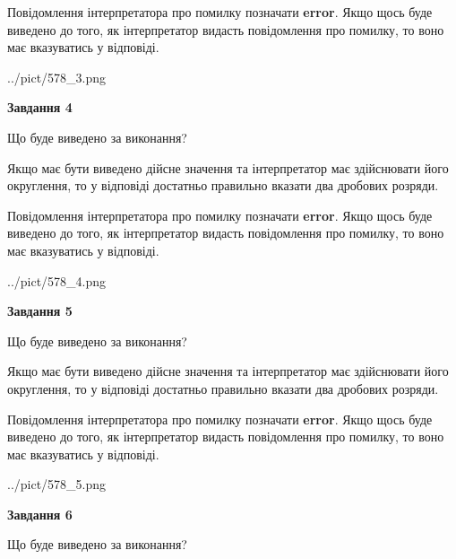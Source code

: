 \documentclass[12pt, ukrainian]{article}
\begin{document}
{\begin {Large}
Повідомлення інтерпретатора про помилку позначати \textbf{error}.
Якщо щось буде виведено до того, як інтерпретатор видасть повідомлення про помилку, 
то воно має вказуватись у відповіді. \par

\begin{center}
	{../pict/578_3.png}
\end{center}
\newpage

{\begin {center}\textbf{Завдання 4}\end {center}}\par
Що буде виведено за виконання? \par

Якщо має бути виведено дійсне значення та інтерпретатор має здійснювати його округлення, 
то у відповіді достатньо правильно вказати два дробових розряди.

Повідомлення інтерпретатора про помилку позначати \textbf{error}.
Якщо щось буде виведено до того, як інтерпретатор видасть повідомлення про помилку, 
то воно має вказуватись у відповіді. \par

\begin{center}
	{../pict/578_4.png}
\end{center}
\newpage

{\begin {center}\textbf{Завдання 5}\end {center}}\par
Що буде виведено за виконання? \par

Якщо має бути виведено дійсне значення та інтерпретатор має здійснювати його округлення, 
то у відповіді достатньо правильно вказати два дробових розряди.

Повідомлення інтерпретатора про помилку позначати \textbf{error}.
Якщо щось буде виведено до того, як інтерпретатор видасть повідомлення про помилку, 
то воно має вказуватись у відповіді. \par

\begin{center}
	{../pict/578_5.png}
\end{center}
\newpage

{\begin {center}\textbf{Завдання 6}\end {center}}\par
Що буде виведено за виконання? \par


\end{Large}}
\end{document}
